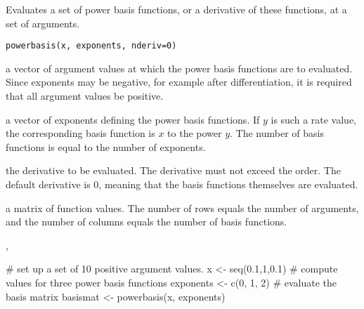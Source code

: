\begin{Description}\relax
Evaluates a set of power basis functions, or a derivative of these
functions, at a set of arguments.
\end{Description}
\begin{Usage}
\begin{verbatim}
powerbasis(x, exponents, nderiv=0)
\end{verbatim}
\end{Usage}
\begin{Arguments}
\begin{ldescription}
\item[\code{x}] a vector of argument values at which the power basis functions are to
evaluated. Since exponents may be negative, for example after
differentiation, it is required that all argument values be positive.

\item[\code{exponents}] a vector of exponents defining the power basis functions.  If
$y$ is such a rate value, the corresponding basis function is
$x$ to the power $y$.  The number of basis functions is equal to the
number of exponents.

\item[\code{nderiv}] the derivative to be evaluated.  The derivative must not exceed the
order.  The default derivative is 0, meaning that the basis functions
themselves are evaluated.

\end{ldescription}
\end{Arguments}
\begin{Value}
a matrix of function values.  The number of rows equals the number of
arguments, and the number of columns equals the number of basis
functions.
\end{Value}
\begin{SeeAlso}\relax
{}, 
\end{SeeAlso}
\begin{Examples}
\begin{ExampleCode}

#  set up a set of 10 positive argument values.
x <- seq(0.1,1,0.1)
#  compute values for three power basis functions
exponents <- c(0, 1, 2)
#  evaluate the basis matrix
basismat <- powerbasis(x, exponents)

\end{ExampleCode}
\end{Examples}

